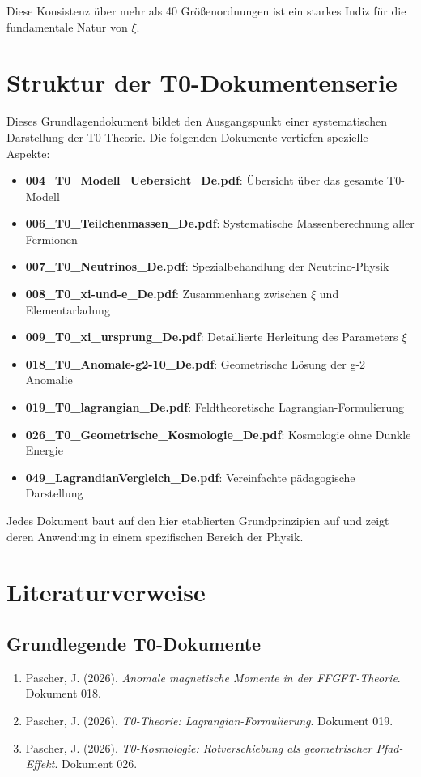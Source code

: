 	Diese Konsistenz über mehr als 40 Größenordnungen ist ein starkes Indiz für die fundamentale Natur von $\xi$.
	
	\section{Struktur der T0-Dokumentenserie}
	
	Dieses Grundlagendokument bildet den Ausgangspunkt einer systematischen Darstellung der T0-Theorie. Die folgenden Dokumente vertiefen spezielle Aspekte:
	
	\begin{itemize}
		\item \textbf{004\_T0\_Modell\_Uebersicht\_De.pdf}: Übersicht über das gesamte T0-Modell
		\item \textbf{006\_T0\_Teilchenmassen\_De.pdf}: Systematische Massenberechnung aller Fermionen
		\item \textbf{007\_T0\_Neutrinos\_De.pdf}: Spezialbehandlung der Neutrino-Physik
		\item \textbf{008\_T0\_xi-und-e\_De.pdf}: Zusammenhang zwischen $\xi$ und Elementarladung
		\item \textbf{009\_T0\_xi\_ursprung\_De.pdf}: Detaillierte Herleitung des Parameters $\xi$
		\item \textbf{018\_T0\_Anomale-g2-10\_De.pdf}: Geometrische Lösung der g-2 Anomalie
		\item \textbf{019\_T0\_lagrangian\_De.pdf}: Feldtheoretische Lagrangian-Formulierung
		\item \textbf{026\_T0\_Geometrische\_Kosmologie\_De.pdf}: Kosmologie ohne Dunkle Energie
		\item \textbf{049\_LagrandianVergleich\_De.pdf}: Vereinfachte pädagogische Darstellung
	\end{itemize}
	
	Jedes Dokument baut auf den hier etablierten Grundprinzipien auf und zeigt deren Anwendung in einem spezifischen Bereich der Physik.
	
	\section{Literaturverweise}
	
	\subsection{Grundlegende T0-Dokumente}
	
	\begin{enumerate}
		\item Pascher, J. (2026). \textit{Anomale magnetische Momente in der FFGFT-Theorie}. Dokument 018.
		\item Pascher, J. (2026). \textit{T0-Theorie: Lagrangian-Formulierung}. Dokument 019.
		\item Pascher, J. (2026). \textit{T0-Kosmologie: Rotverschiebung als geometrischer Pfad-Effekt}. Dokument 026.
	\end{enumerate}
	

